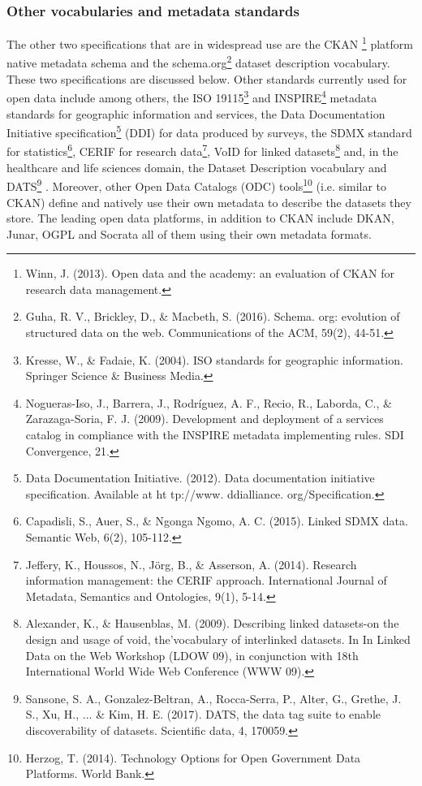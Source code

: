 \documentclass[<options>]{elsarticle}
\begin{document}
\subsubsection{Other vocabularies and metadata standards}
The other two specifications that are in widespread use are the CKAN \footnote{Winn, J. (2013). Open data and the academy: an evaluation of CKAN for research data management.} platform native metadata schema and the schema.org\footnote{ Guha, R. V., Brickley, D., \& Macbeth, S. (2016). Schema. org: evolution of structured data on the web. Communications of the ACM, 59(2), 44-51.} dataset description vocabulary. These two specifications are discussed below. Other standards currently used for open data include among others, the ISO 19115\footnote{ Kresse, W., \& Fadaie, K. (2004). ISO standards for geographic information. Springer Science \& Business Media.} and INSPIRE\footnote{ Nogueras-Iso, J., Barrera, J., Rodríguez, A. F., Recio, R., Laborda, C., \& Zarazaga-Soria, F. J. (2009). Development and deployment of a services catalog in compliance with the INSPIRE metadata implementing rules. SDI Convergence, 21.} metadata standards for geographic information and services, the Data Documentation Initiative specification\footnote{  Data Documentation Initiative. (2012). Data documentation initiative specification. Available at ht tp://www. ddialliance. org/Specification.} (DDI) for data produced by surveys, the SDMX standard for statistics\footnote{Capadisli, S., Auer, S., \& Ngonga Ngomo, A. C. (2015). Linked SDMX data. Semantic Web, 6(2), 105-112.}, CERIF for research data\footnote{Jeffery, K., Houssos, N., Jörg, B., \& Asserson, A. (2014). Research information management: the CERIF approach. International Journal of Metadata, Semantics and Ontologies, 9(1), 5-14.}, VoID for linked datasets\footnote{Alexander, K., \& Hausenblas, M. (2009). Describing linked datasets-on the design and usage of void, the’vocabulary of interlinked datasets. In In Linked Data on the Web Workshop (LDOW 09), in conjunction with 18th International World Wide Web Conference (WWW 09).} and, in the healthcare and life sciences domain, the Dataset Description vocabulary and DATS\footnote{Sansone, S. A., Gonzalez-Beltran, A., Rocca-Serra, P., Alter, G., Grethe, J. S., Xu, H., ... \& Kim, H. E. (2017). DATS, the data tag suite to enable discoverability of datasets. Scientific data, 4, 170059.} . Moreover, other Open Data Catalogs (ODC) tools\footnote{Herzog, T. (2014). Technology Options for Open Government Data Platforms. World Bank.} (i.e. similar to CKAN) define and natively use their own metadata to describe the datasets they store. The leading open data platforms, in addition to CKAN include DKAN, Junar, OGPL and Socrata all of them using their own metadata formats.
\end{document}
